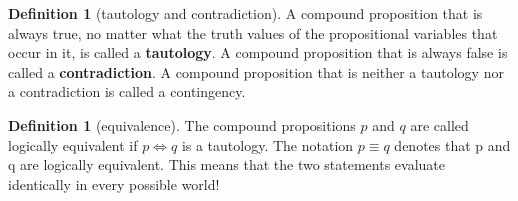 \documentclass[letterpaper,10pt]{article}
\theoremstyle{plain}
\theoremstyle{definition}
\newtheorem{defn}[thm]{Definition}
\theoremstyle{remark}
\begin{document}
\begin{defn}[tautology and contradiction]

A compound proposition that is always true, no matter what the truth values of the propositional
variables that occur in it, is called a \textbf{tautology}. A compound proposition that is always
false is called a \textbf{contradiction}. A compound proposition that is neither a tautology nor a
contradiction is called a contingency.

\end{defn}
\begin{defn}[equivalence]
The compound propositions $p$ and $q$ are called logically equivalent if $p \iff q$ is a tautology.
The notation $p \equiv q$ denotes that p and q are logically equivalent. This means that the two statements evaluate identically in every possible world!
\end{defn}
\end{document}
